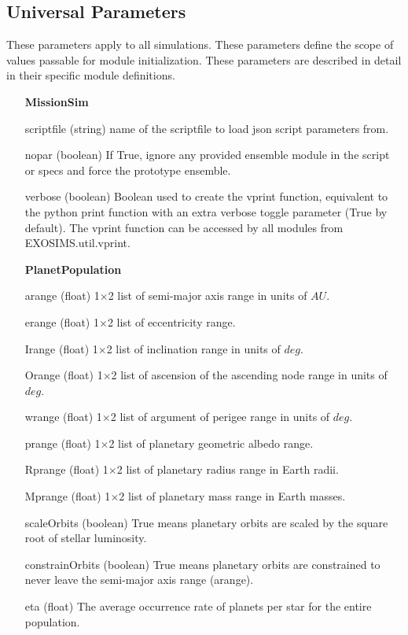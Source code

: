 \documentclass[cleanfoot]{asme2ej}
\begin{document}
\subsection{Universal Parameters}
These parameters apply to all simulations. These parameters define the scope of values passable for module initialization. These parameters are described in detail in their specific module definitions.

\begin{itemize}[leftmargin=1.5in,font={\ttfamily}]

\item[\textbf{MissionSim}]
\item[scriptfile] (string) name of the scriptfile to load json script parameters from.
\item[nopar] (boolean) If True, ignore any provided ensemble module in the script or specs and force the prototype ensemble.
\item[verbose] (boolean) Boolean used to create the vprint function, equivalent to the python print function with an extra verbose toggle parameter (True by default). The vprint function can be accessed by all modules from EXOSIMS.util.vprint.

\item[\textbf{PlanetPopulation}]
\item[arange] (float) 1$\times$2 list of semi-major axis range in units of $ AU $. 
\item[erange] (float) 1$\times$2 list of eccentricity range.
\item[Irange] (float) 1$\times$2 list of inclination range in units of $ deg $.  
\item[Orange] (float) 1$\times$2 list of ascension of the ascending node range in units of $ deg $.  
\item[wrange] (float) 1$\times$2 list of argument of perigee range in units of $ deg $. 
\item[prange] (float) 1$\times$2 list of planetary geometric albedo range.  
\item[Rprange] (float) 1$\times$2 list of planetary radius range in Earth radii.  
\item[Mprange] (float) 1$\times$2 list of planetary mass range in Earth masses.  
\item [scaleOrbits] (boolean) True means planetary orbits are scaled by the square root of stellar luminosity. 
\item[constrainOrbits] (boolean) True means planetary orbits are constrained to never leave the semi-major axis range (arange).
\item[eta] (float) The average occurrence rate of planets per star for the entire population.


\end{itemize}
\end{document}

